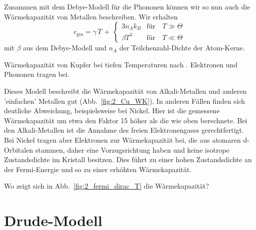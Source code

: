Zusammen mit dem Debye-Modell für die Phononen können wir so nun auch die Wärmekapazität von Metallen beschreiben. Wir erhalten
\begin{equation}
    c_\text{ges} = \gamma \, T \, + \, 
        \left\{ 
        \begin{matrix}
            3 n_A k_B & \text{für} \quad T \gg \Theta \\
            \beta T^3 & \text{für} \quad T \ll \Theta 
        \end{matrix}
        \right.
\end{equation}
mit $\beta$ aus dem Debye-Modell und $n_A$ der Teilchenzahl-Dichte der Atom-Kerne.



\begin{marginfigure}
    \caption{Wärmekapazität von Kupfer bei tiefen Temperaturen nach \cite{Rayne1956}. Elektronen und Phononen tragen bei. \label{fig:2_Cu_WK}}
\end{marginfigure}


Dieses Modell beschreibt die Wärmekapazität von Alkali-Metallen und anderen 'einfachen' Metallen gut (Abb.~\ref{fig:2_Cu_WK}). In anderen Fällen finden sich deutliche Abweichung, beispielsweise bei Nickel. Hier ist die gemessene Wärmekapazität um etwa den Faktor 15 höher als die wie oben berechnete. Bei den Alkali-Metallen ist die Annahme des freien Elektronengases gerechtfertigt. Bei Nickel tragen aber Elektronen zur Wärmekapazität bei, die aus atomaren d-Orbitalen stammen, daher eine Vorzugsrichtung haben und keine isotrope Zustandsdichte im Kristall besitzen. Dies führt zu einer hohen Zustandsdichte an der Fermi-Energie und so zu einer erhöhten Wärmekapazität.


\begin{questions} 
    \item Wo zeigt sich in Abb.~\ref{fig:2_fermi_dirac_T} die Wärmekapazität?
\end{questions}
    
    



\section{Drude-Modell}

